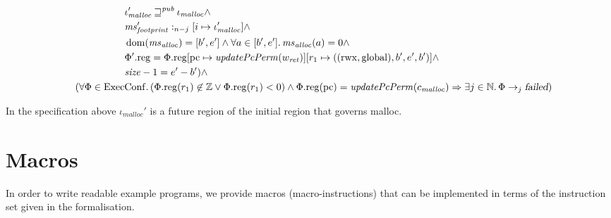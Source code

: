 \documentclass[a4paper]{article}
\newcommand{\update}[2]{[#1 \mapsto #2]}
\DeclareMathOperator{\dom}{dom}
\newcommand\lau[1]{{\color{purple} \sf \footnotesize {LS: #1}}\\}
\newcommand\dominique[1]{{\color{purple} \sf \footnotesize {DD: #1}}\\}
\renewcommand\lau[1]{}
\renewcommand\dominique[1]{}
\newcommand{\var}[1]{\mathit{#1}}
\newcommand{\hs}{\var{ms}}
\newcommand{\ms}{\hs}
\newcommand{\pcreg}{\mathrm{pc}}
\newcommand{\heap}{\var{mem}}
\newcommand{\plainproj}[1]{\mathrm{#1}}
\newcommand{\memreg}[1][\Phi]{#1.\plainproj{reg}}
\newcommand{\failed}{\textsl{failed}}
\newcommand{\plainfun}[2]{
  \ifthenelse{\equal{#2}{}}
  {\mathit{#1}}
  {\mathit{#1}(#2)}
}
\newcommand{\updatePcPerm}[1]{\plainfun{updatePcPerm}{#1}}
\newcommand{\futurewk}{\mathbin{\sqsupseteq}^{\var{pub}}}
\newcommand{\heapSat}[3][\heap]{#1 :_{#2} #3}
\newcommand{\codelabel}[1]{\mathit{#1}}
\newcommand{\malloc}{\codelabel{malloc}}
\newcommand{\plaindom}[1]{\mathrm{#1}}
\newcommand{\ExecConfs}{\plaindom{ExecConf}}
\newcommand{\nats}{\mathbb{N}}
\newcommand{\ints}{\mathbb{Z}}
\newcommand{\plainperm}[1]{\mathrm{#1}}
\newcommand{\rwx}{\plainperm{rwx}}
\newcommand{\glob}{\plainperm{global}}
\newcommand{\step}[1][]{\rightarrow_{#1}}
\begin{document}
\begin{specification}
\[\begin{aligned}
                    &\qquad \qquad \qquad \iota_{\malloc}' \futurewk \iota_\malloc \land \\
                    &\qquad \qquad \qquad \heapSat[\ms_{\var{footprint}}']{n-j}{[i \mapsto \iota_\malloc']} \land \\
                    &\qquad \qquad \qquad \dom(\hs_{\var{alloc}}) = [b',e'] \land \forall a \in [b',e']\ldotp \hs_{\var{alloc}}(a) = 0  \land \\
                    &\qquad \qquad \qquad \memreg[\Phi'] = \memreg[\Phi]\update{\pcreg}{\updatePcPerm{w_{\var{ret}}}}\update{r_1}{((\rwx,\glob),b',e',b')} \land \\
                    &\qquad \qquad \qquad \size - 1 = e'-b' ) \land\\
                    &\quad (\forall \Phi \in \ExecConfs \ldotp (\memreg(r_1)
                    \not\in \ints \vee \memreg(r_1) < 0) \land \memreg(\pcreg) = \updatePcPerm{c_\malloc} \Rightarrow \exists j \in \nats \ldotp \Phi \step[j] \failed)
                  \end{aligned}
                \]
              \end{specification}
              In the specification above $\iota_\malloc'$ is a future region of the initial region that governs malloc.
              \lau{What about $c_\malloc$ and the value relation? Do we add this to the specification or try to prove it based on the specification?}

              \section{Macros}
              In order to write readable example programs, we provide macros (macro-instructions) that can be implemented in terms of the instruction set given in the formalisation.
              \dominique{Similarly: how is malloc invoked?  Do we trust malloc enough to not encapsulate ourselves from it, i.e. provide an rx return capability and use callee-save registers?}
              \lau{ I think this is a conceptual question as we can make it work with either. We already trust malloc to give us a fresh piece of memory and not reuse it later on, so we already assume malloc to be somewhat trusted, so why not go all the way? }
              \lau{Agreed.}

              \dominique{what does ``fetch the capability ...'' mean?}
              \lau{ We don't know where the capability resides, but if it is in memory, then it will be loaded into a register. }
              \dominique{Wouldn't it be more clear to provide call with two explicit lists of registers: those which need to be stored, and those which are provided as arguments (i.e. which do not need to be erased)?}
              \dominique{Perhaps you could also provide an explicit syntax for ``undefined symbols'' that should be filled in by a linker?}
\end{document}
